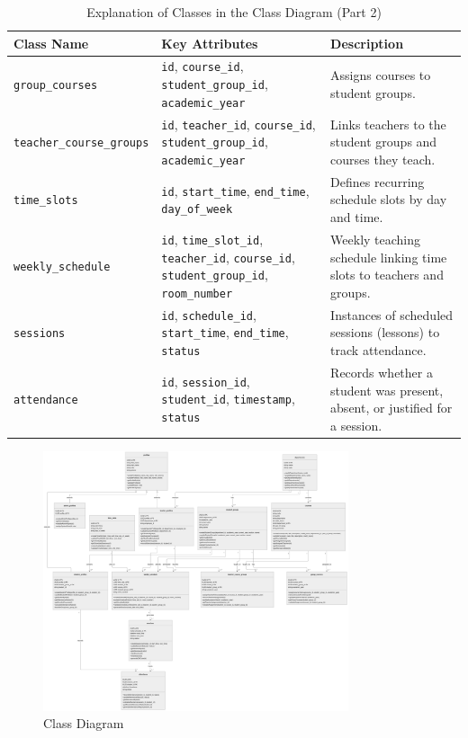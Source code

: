 \documentclass[12pt,a4paper]{report}
\begin{document}
\begin{table}[H]
\centering
\small
\caption{Explanation of Classes in the Class Diagram (Part 2)}
\renewcommand{\arraystretch}{1.3}
\begin{tabular}{|p{3cm}|p{4cm}|p{7.5cm}|}
\hline
\textbf{Class Name} & \textbf{Key Attributes} & \textbf{Description} \\
\hline
\texttt{group\_courses} & \texttt{id}, \texttt{course\_id}, \texttt{student\_group\_id}, \texttt{academic\_year} & Assigns courses to student groups. \\
\hline
\texttt{teacher\_course\_groups} & \texttt{id}, \texttt{teacher\_id}, \texttt{course\_id}, \texttt{student\_group\_id}, \texttt{academic\_year} & Links teachers to the student groups and courses they teach. \\
\hline
\texttt{time\_slots} & \texttt{id}, \texttt{start\_time}, \texttt{end\_time}, \texttt{day\_of\_week} & Defines recurring schedule slots by day and time. \\
\hline
\texttt{weekly\_schedule} & \texttt{id}, \texttt{time\_slot\_id}, \texttt{teacher\_id}, \texttt{course\_id}, \texttt{student\_group\_id}, \texttt{room\_number} & Weekly teaching schedule linking time slots to teachers and groups. \\
\hline
\texttt{sessions} & \texttt{id}, \texttt{schedule\_id}, \texttt{start\_time}, \texttt{end\_time}, \texttt{status} & Instances of scheduled sessions (lessons) to track attendance. \\
\hline
\texttt{attendance} & \texttt{id}, \texttt{session\_id}, \texttt{student\_id}, \texttt{timestamp}, \texttt{status} & Records whether a student was present, absent, or justified for a session. \\
\hline
\end{tabular}
\end{table}

\vspace{10cm}
\begin{figure}[htbp]
    \centering
    \includegraphics[width=0.8\textwidth]{images/morsli/Editor _ Mermaid Chart-2025-05-19-234958.png}
    \caption{Class Diagram}
    \label{fig:attendance-system}
\end{figure}
\end{document}
